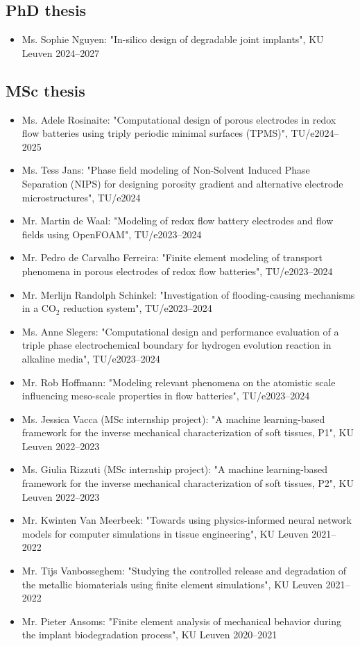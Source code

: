 \documentclass{cv}
\begin{document}
\subsection{PhD thesis}

\begin{itemize}[itemsep=-0.2ex]
\item
Ms. Sophie Nguyen: "In-silico design of degradable joint implants", KU Leuven \hfill 2024--2027
\end{itemize}

\subsection{MSc thesis}

\begin{itemize}[itemsep=-0.2ex]
\item
Ms. Adele Rosinaite: "Computational design of porous electrodes in redox flow batteries using triply periodic minimal surfaces (TPMS)", TU/e\hfill 2024--2025
\item
Ms. Tess Jans: "Phase field modeling of Non-Solvent Induced Phase Separation (NIPS) for designing porosity gradient and alternative electrode microstructures", TU/e\hfill 2024
\item
Mr. Martin de Waal: "Modeling of redox flow battery electrodes and flow fields using OpenFOAM", TU/e\hfill 2023--2024
\item
Mr. Pedro de Carvalho Ferreira: "Finite element modeling of transport phenomena in porous electrodes of redox flow batteries", TU/e\hfill 2023--2024
\item
Mr. Merlijn Randolph Schinkel: "Investigation of flooding-causing
mechanisms in a $\textrm{CO}_2$ reduction system", TU/e\hfill 2023--2024
\item
Ms. Anne Slegers: "Computational design and performance evaluation of a triple phase electrochemical boundary for hydrogen evolution reaction in alkaline media", TU/e\hfill 2023--2024
\item
Mr. Rob Hoffmann: "Modeling relevant phenomena on the atomistic scale influencing meso-scale properties in flow batteries", TU/e\hfill 2023--2024
\item
Ms. Jessica Vacca (MSc internship project): "A machine learning-based framework for the inverse mechanical characterization of soft tissues, P1", KU Leuven \hfill 2022--2023
\item
Ms. Giulia Rizzuti (MSc internship project): "A machine learning-based framework for the inverse mechanical characterization of soft tissues, P2", KU Leuven \hfill 2022--2023
\item 
Mr. Kwinten Van Meerbeek: "Towards using physics-informed neural network models for computer simulations in tissue engineering", KU Leuven \hfill 2021--2022
\item 
Mr. Tijs Vanbosseghem: "Studying the controlled release and
degradation of the metallic biomaterials using finite element simulations", KU Leuven \hfill 2021--2022
\item 
Mr. Pieter Ansoms: "Finite element analysis of mechanical behavior during the implant biodegradation process", KU Leuven \hfill 2020--2021
\end{itemize}
\end{document}
